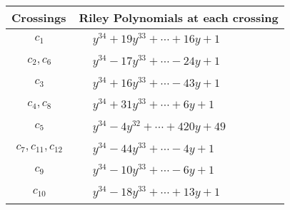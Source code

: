 \documentclass[1p]{elsarticle_modified}
\theoremstyle{definition}
\begin{document}
\begin{tabular}{m{50pt}|m{274pt}}
Crossings & \hspace{64pt}Riley Polynomials at each crossing \\
\hline $$\begin{aligned}c_{1}\end{aligned}$$&$\begin{aligned}
&y^{34}+19 y^{33}+\cdots+16 y+1
\end{aligned}$\\
\hline $$\begin{aligned}c_{2},c_{6}\end{aligned}$$&$\begin{aligned}
&y^{34}-17 y^{33}+\cdots-24 y+1
\end{aligned}$\\
\hline $$\begin{aligned}c_{3}\end{aligned}$$&$\begin{aligned}
&y^{34}+16 y^{33}+\cdots-43 y+1
\end{aligned}$\\
\hline $$\begin{aligned}c_{4},c_{8}\end{aligned}$$&$\begin{aligned}
&y^{34}+31 y^{33}+\cdots+6 y+1
\end{aligned}$\\
\hline $$\begin{aligned}c_{5}\end{aligned}$$&$\begin{aligned}
&y^{34}-4 y^{32}+\cdots+420 y+49
\end{aligned}$\\
\hline $$\begin{aligned}c_{7},c_{11},c_{12}\end{aligned}$$&$\begin{aligned}
&y^{34}-44 y^{33}+\cdots-4 y+1
\end{aligned}$\\
\hline $$\begin{aligned}c_{9}\end{aligned}$$&$\begin{aligned}
&y^{34}-10 y^{33}+\cdots-6 y+1
\end{aligned}$\\
\hline $$\begin{aligned}c_{10}\end{aligned}$$&$\begin{aligned}
&y^{34}-18 y^{33}+\cdots+13 y+1
\end{aligned}$\\
\hline
\end{tabular}\\~\\
\end{document}
